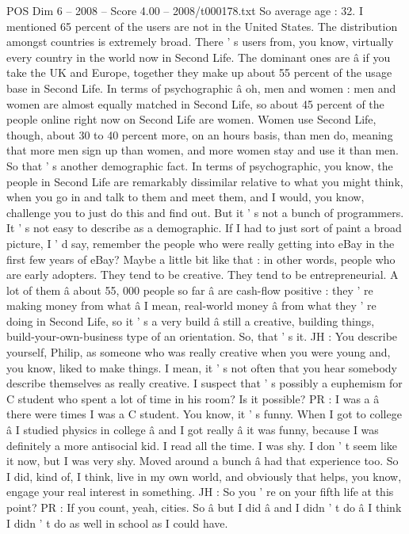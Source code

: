 \begin{textsample}{POS Dim 6 – 2008 – Score 4.00 – 2008/t000178.txt}
So average age : 32.
I mentioned 65 percent of the users are not in the United States.
The distribution amongst countries is extremely broad.
There ' s users from, you know, virtually every country in the world now in Second Life.
The dominant ones are â if you take the UK and Europe, together they make up about 55 percent of the usage base in Second Life.
In terms of psychographic â oh, men and women : men and women are almost equally matched in Second Life, so about 45 percent of the people online right now on Second Life are women.
Women use Second Life, though, about 30 to 40 percent more, on an hours basis, than men do, meaning that more men sign up than women, and more women stay and use it than men.
So that ' s another demographic fact.
In terms of psychographic, you know, the people in Second Life are remarkably dissimilar relative to what you might think, when you go in and talk to them and meet them, and I would, you know, challenge you to just do this and find out.
But it ' s not a bunch of programmers.
It ' s not easy to describe as a demographic.
If I had to just sort of paint a broad picture, I ' d say, remember the people who were really getting into eBay in the first few years of eBay?
Maybe a little bit like that : in other words, people who are early adopters.
They tend to be creative.
They tend to be entrepreneurial.
A lot of them â about 55, 000 people so far â are cash-flow positive : they ' re making money from what â I mean, real-world money â from what they ' re doing in Second Life, so it ' s a very build â still a creative, building things, build-your-own-business type of an orientation.
So, that ' s it.
JH : You describe yourself, Philip, as someone who was really creative when you were young and, you know, liked to make things.
I mean, it ' s not often that you hear somebody describe themselves as really creative.
I suspect that ' s possibly a euphemism for C student who spent a lot of time in his room?
Is it possible?
PR : I was a â there were times I was a C student.
You know, it ' s funny.
When I got to college â I studied physics in college â and I got really â it was funny, because I was definitely a more antisocial kid.
I read all the time.
I was shy.
I don ' t seem like it now, but I was very shy.
Moved around a bunch â had that experience too.
So I did, kind of, I think, live in my own world, and obviously that helps, you know, engage your real interest in something.
JH : So you ' re on your fifth life at this point?
PR : If you count, yeah, cities.
So â but I did â and I didn ' t do â I think I didn ' t do as well in school as I could have.

\end{textsample}
